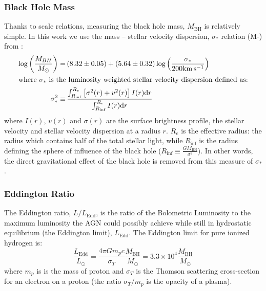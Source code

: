 		\subsubsection{Black Hole Mass}
			Thanks to scale relations, measuring the black hole mass, $M_\mathrm{BH}$ is relatively simple. In this work we use the mass -- stellar velocity dispersion, $\sigma_\ast$ relation (M-\textsigma) from \citet{McConnell2013}:
			\begin{align}
				\log\left(\frac{M_{BH}}{M_\odot}\right) = & \, (8.32 \pm 0.05) + (5.64 \pm 0.32) \log\left(\frac{\sigma_\ast}{200 \mathrm{km \, s^{-1}}}\right) \\
				\intertext{where $\sigma_\ast$ is the luminosity weighted stellar velocity dispersion defined as:} 
				\sigma_\ast^2 \equiv & \, \frac{\int_{R_\mathrm{inf}}^{R_e} \left[\sigma^2(r) + v^2(r)\right] I(r) \mathrm{d}r}{\int_{R_\mathrm{inf}}^{R_e} I(r) \mathrm{d}r}
			\end{align}
			where $I(r)$, $v(r)$ and $\sigma(r)$ are the surface brightness profile, the stellar velocity and stellar velocity dispersion at a radius $r$. $R_e$ is the effective radius: the radius which contains half of the total stellar light, while $R_\mathrm{inf}$ is the radius defining the sphere of influence of the black hole ($R_\mathrm{inf} \equiv \frac{GM_\mathrm{BH}}{\sigma^2}$). In other words, the direct gravitational effect of the black hole is removed from this measure of $\sigma_\ast$. %


		\subsubsection{Eddington Ratio}
			The Eddington ratio, $L/L_\mathrm{Edd}$, is the ratio of the Bolometric Luminosity to the maximum luminosity the AGN could possibly achieve while still in hydrostatic equilibrium (the Eddington limit), $L_\mathrm{Edd}$. The Eddington limit for pure ionized hydrogen is:
			\begin{equation}
				\frac{L_\mathrm{Edd}}{L_\odot} = \frac{4 \pi G m_p c}{\sigma_T}	\frac{M_\mathrm{BH}}{M_\odot} = 3.3 \times 10^4 \frac{M_\mathrm{BH}}{M_\odot}
			\end{equation}
			where $m_p$ is is the mass of proton and $\sigma_T$ is the Thomson scattering cross-section for an electron on a proton (the ratio $\sigma_T/m_p$ is the opacity of a plasma). 

